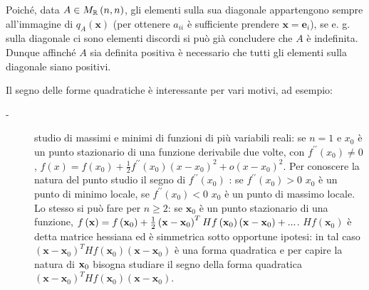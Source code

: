 \documentclass{article}
\begin{document}
Poich\'{e}, data $A\in M_{%
\mathbb{R}
}\left( n,n\right) $, gli elementi sulla sua diagonale appartengono sempre
all'immagine di $q_{A}\left( \mathbf{x}\right) $ (per ottenere $a_{ii}$ \`{e}
sufficiente prendere $\mathbf{x=e}_{i}$), se e. g. sulla diagonale ci sono
elementi discordi si pu\`{o} gi\`{a} concludere che $A$ \`{e} indefinita.
Dunque affinch\'{e} $A$ sia definita positiva \`{e} necessario che tutti gli
elementi sulla diagonale siano positivi.

Il segno delle forme quadratiche \`{e} interessante per vari motivi, ad
esempio:

\begin{description}
\item[-] studio di massimi e minimi di funzioni di pi\`{u} variabili reali:
se $n=1$ e $x_{0}$ \`{e} un punto stazionario di una funzione derivabile due
volte, con $f^{\prime \prime }\left( x_{0}\right) \neq 0$, $f\left( x\right)
=f\left( x_{0}\right) +\frac{1}{2}f^{\prime \prime }\left( x_{0}\right)
\left( x-x_{0}\right) ^{2}+o\left( x-x_{0}\right) ^{2}$. Per conoscere la
natura del punto studio il segno di $f^{\prime \prime }\left( x_{0}\right) $%
: se $f^{\prime \prime }\left( x_{0}\right) >0$ $x_{0}$ \`{e} un punto di
minimo locale, se $f^{\prime \prime }\left( x_{0}\right) <0$ $x_{0}$ \`{e}
un punto di massimo locale. Lo stesso si pu\`{o} fare per $n\geq 2$: se $%
\mathbf{x}_{0}$ \`{e} un punto stazionario di una funzione, $f\left( \mathbf{%
x}\right) =f\left( \mathbf{x}_{0}\right) +\frac{1}{2}\left( \mathbf{x-x}%
_{0}\right) ^{T}Hf\left( \mathbf{x}_{0}\right) \left( \mathbf{x-x}%
_{0}\right) +...$. $Hf\left( \mathbf{x}_{0}\right) $ \`{e} detta matrice
hessiana ed \`{e} simmetrica sotto opportune ipotesi: in tal caso $\left( 
\mathbf{x-x}_{0}\right) ^{T}Hf\left( \mathbf{x}_{0}\right) \left( \mathbf{x-x%
}_{0}\right) $ \`{e} una forma quadratica e per capire la natura di $\mathbf{%
x}_{0}$ bisogna studiare il segno della forma quadratica $\left( \mathbf{x-x}%
_{0}\right) ^{T}Hf\left( \mathbf{x}_{0}\right) \left( \mathbf{x-x}%
_{0}\right) $.


\end{description}
\end{document}
